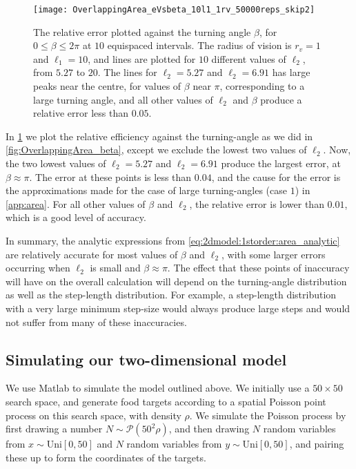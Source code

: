 \begin{figure}[h!]
	\centering
	\texttt{[image: OverlappingArea\_eVsbeta\_10l1\_1rv\_50000reps\_skip2]}
	\caption[The relative error in our analytic expressions for the overlap plotted against the turning-angle]{The relative error plotted against the turning angle $\beta$, for $0 \leq \beta \leq 2 \pi$ at $10$ equispaced intervals. The radius of vision is $r_v=1$ and $\ell_1 = 10$, and lines are plotted for $10$ different values of $\ell_2$, from $5.27$ to $20$. The lines for $\ell_2=5.27$ and $\ell_2 = 6.91$ has large peaks near the centre, for values of $\beta$ near $\pi$, corresponding to a large turning angle, and all other values of $\ell_2$ and $\beta$ produce a relative error less than $0.05$. \label{fig:OverlappingArea_beta_skip}}
\end{figure}

In \cref{fig:OverlappingArea_beta_skip} we plot the relative efficiency against the turning-angle as we did in \cref{fig:OverlappingArea_beta}, except we exclude the lowest two values of $\ell_2$. Now, the two lowest values of $\ell_2 = 5.27$ and $\ell_2=6.91$ produce the largest error, at $\beta \approx \pi$. The error at these points is less than $0.04$, and the cause for the error is the approximations made for the case of large turning-angles (case $1$) in \cref{app:area}. For all other values of $\beta$ and $\ell_2$, the relative error is lower than $0.01$, which is a good level of accuracy.

In summary, the analytic expressions from \cref{eq:2dmodel:1storder:area_analytic} are relatively accurate for most values of $\beta$ and $\ell_2$, with some larger errors occurring when $\ell_2$ is small and $\beta \approx \pi$. The effect that these points of inaccuracy will have on the overall calculation will depend on the turning-angle distribution as well as the step-length distribution. For example, a step-length distribution with a very large minimum step-size would always produce large steps and would not suffer from many of these inaccuracies. 


\FloatBarrier
\subsection{Simulating our two-dimensional model}
\label{sec:2dmodel:simulation}

We use Matlab to simulate the model outlined above. We initially use a $50 \times 50$ search space, and generate food targets according to a spatial Poisson point process on this search space, with density $\rho$. We simulate the Poisson process by first drawing a number $N \sim \mathcal{P}(50^2\rho )$, and then drawing $N$ random variables from $x \sim \text{Uni}[0,50]$ and $N$ random variables from $y \sim \text{Uni}[0,50]$, and pairing these up to form the coordinates of the targets.

